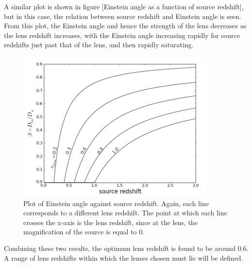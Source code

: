 	A similar plot is shown in figure [Einstein angle as a function of source redshift], but in this case, the relation between source redshift and Einstein angle is seen. From this plot, the Einstein angle and hence the strength of the lens decreases as the lens redshift increases, with the Einstein angle increasing rapidly for source redshifts just past that of the lens, and then rapidly saturating.
	\begin{figure}[ht]
		\centering
			\includegraphics[width=\textwidth]{../Images/Einstein_angle_as_a_function_of_source_redshift.png}
		\caption[Einstein angle as a function of source redshift]{\cite{Constraining_source_redshift_distributions} Plot of Einstein angle against source redshift. Again, each line corresponds to a different lens redshift. The point at which each line crosses the x-axis is the lens redshift, since at the lens, the magnification of the source is equal to 0.\label{fig:Einstein_angle_as_a_function_of_source_redshift}}
	\end{figure}

	Combining these two results, the optimum lens redshift is found to be around 0.6. A range of lens redshifts within which the lenses chosen must lie will be defined.
	
